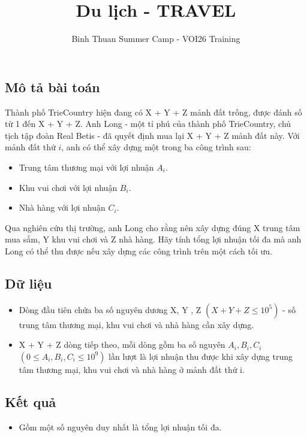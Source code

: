 \documentclass[12pt]{article}
\begin{document}
\title{Du lịch - TRAVEL}
\author{Binh Thuan Summer Camp - VOI26 Training}
\maketitle

\setlength{\parindent}{0pt}
\setlength{\parskip}{1em} 

\subsection*{Mô tả bài toán}
Thành phố TrieCountry hiện đang có X + Y + Z mảnh đất trống, được đánh số từ 1 đến X + Y + Z.
Anh Long - một tỉ phú của thành phố TrieCountry, chủ tịch tập đoàn Real Betis - đã quyết định mua
lại X + Y + Z mảnh đất này. Với mảnh đất thứ $i$, anh có thể xây dựng một trong ba công trình
sau:

\begin{itemize}
  \item Trung tâm thương mại với lợi nhuận $A_i$.
  \item Khu vui chơi với lợi nhuận $B_i$.
  \item Nhà hàng với lợi nhuận $C_i$.
\end{itemize}

Qua nghiên cứu thị trường, anh Long cho rằng nên xây dựng đúng X trung tâm mua sắm, Y khu
vui chơi và Z nhà hàng. Hãy tính tổng lợi nhuận tối đa mà anh Long có thể thu được nếu xây
dựng các công trình trên một cách tối ưu.

\subsection*{Dữ liệu}
\begin{itemize}
  \item Dòng đầu tiên chứa ba số nguyên dương X, Y , Z $(X + Y + Z \leq 10^5)$ - số trung tâm thương mại, khu vui chơi và nhà hàng cần xây dựng.
  \item X + Y + Z dòng tiếp theo, mỗi dòng gồm ba số nguyên $A_i, B_i, C_i$ $(0 \leq A_i, B_i, C_i \leq 10^9)$ lần 
  lượt là lợi nhuận thu được khi xây dựng trung tâm thương mại, khu vui chơi và nhà hàng ở mảnh đất thứ i.
\end{itemize}

\subsection*{Kết quả}
\begin{itemize}
  \item Gồm một số nguyên duy nhất là tổng lợi nhuận tối đa.
\end{itemize}
\end{document}
